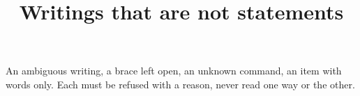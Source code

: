 \documentclass{article}
\title{Writings that are not statements}
\begin{document}
\maketitle
An ambiguous writing, a brace left open, an unknown command, an item with
words only. Each must be refused with a reason, never read one way or the
other.
\begin{enumerate}
\item $\displaystyle \frac{d}{dx}(x^{2}) \cdot (x) = 3x^{2}$
\item $\displaystyle \frac{1}{x = 2$
\item $\displaystyle \thiscommanddoesnotexist{x} = x$
\item This item has no formula.
\end{enumerate}
\end{document}
